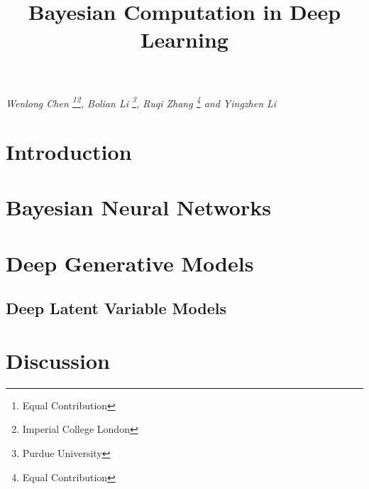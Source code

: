 \documentclass{article}
\title{\huge\textbf{Bayesian Computation in Deep Learning}}
\date{}
\numberwithin{equation}{section}
\theoremstyle{plain}
\begin{document}
\maketitle
\doublespacing
%  



\begin{center} \label{sec: label}
\begin{large}
{\em Wenlong Chen \footnote[1]{\label{footnote: eq}Equal Contribution}\footnote[2]{\label{footnote: ic}Imperial College London}, Bolian Li \footnote[5]{\label{footnote: pu}Purdue University}, Ruqi Zhang \footnote[4]{\label{footnote: seq}Equal Contribution} and Yingzhen Li }
\end{large}
\end{center}

\section{Introduction}


\vspace{-1em}
\section{Bayesian Neural Networks}
\label{sec:bnn}


\vspace{-2em}
\section{Deep Generative Models}
\label{sec:dgm}

\vspace{-1em}
\subsection{Deep Latent Variable Models}
\label{sec:dgm_lvm}

\section{Discussion}


 

\end{document}
